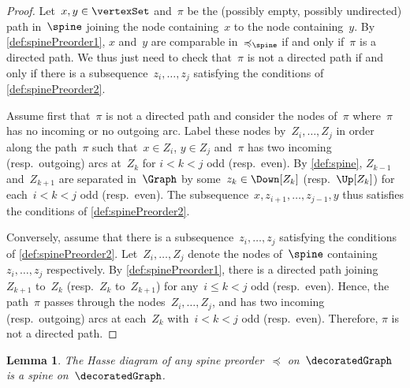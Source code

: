 \documentclass{amsart}
\newtheorem{lemma}[theorem]{Lemma}
\theoremstyle{definition}
\begin{document}
\begin{proof}
  Let~$x, y \in \vertexSet$ and~$\pi$ be the (possibly empty, possibly undirected) path in~$\spine$ joining the node containing~$x$ to the node containing~$y$.
  By \cref{def:spinePreorder1}, $x$ and~$y$ are comparable in~$\preccurlyeq_{\spine}$ if and only if~$\pi$ is a directed path.
  We thus just need to check that~$\pi$ is not a directed path if and only if there is a subsequence~$z_i, \dots, z_j$ satisfying the conditions of \cref{def:spinePreorder2}.
  
  Assume first that~$\pi$ is not a directed path and consider the nodes of~$\pi$ where~$\pi$ has no incoming or no outgoing arc.
  Label these nodes by~$Z_i, \dots, Z_j$ in order along the path~$\pi$ such that~$x \in Z_i$, $y \in Z_j$ and~$\pi$ has two incoming (resp.~outgoing) arcs at~$Z_k$ for $i < k < j$ odd (resp.~even).
  By \cref{def:spine}, $Z_{k-1}$ and~$Z_{k+1}$ are separated in~$\Graph$ by some~$z_k \in \Down[Z_k]$ (resp.~$\Up[Z_k]$) for each~${i < k < j}$ odd (resp.~even).
  The subsequence~$x, z_{i+1}, \dots, z_{j-1}, y$ thus satisfies the conditions of \cref{def:spinePreorder2}.

  Conversely, assume that there is a subsequence~$z_i, \dots, z_j$ satisfying the conditions of \cref{def:spinePreorder2}.
  Let~$Z_i, \dots, Z_j$ denote the nodes of~$\spine$ containing~$z_i, \dots, z_j$ respectively.
  By \cref{def:spinePreorder1}, there is a directed path joining~$Z_{k+1}$ to~$Z_k$ (resp.~$Z_k$ to~$Z_{k+1}$) for any~$i \le k < j$ odd (resp.~even).
  Hence, the path~$\pi$ passes through the nodes~$Z_i, \dots, Z_j$, and has two incoming (resp.~outgoing) arcs at each~$Z_k$ with~$i < k < j$ odd (resp.~even).
  Therefore, $\pi$ is not a directed path.
\end{proof}

\begin{lemma}
  \label{lem:spinePreorder2}
  The Hasse diagram of any spine preorder~$\preccurlyeq$ on~$\decoratedGraph$ is a spine on~$\decoratedGraph$.
\end{lemma}
\end{document}
